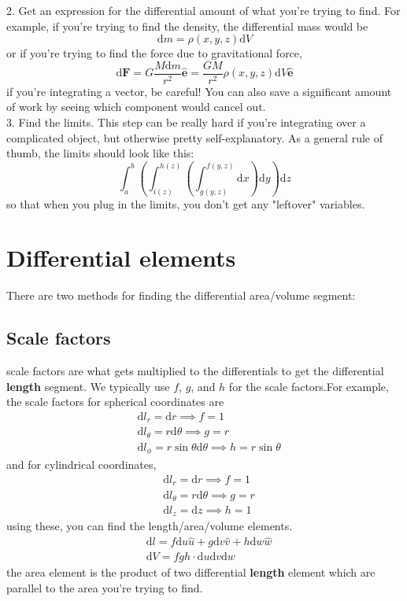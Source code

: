 \documentclass[oneside]{book}
\numberwithin{equation}{chapter} %
\begin{document}
2. Get an expression for the differential amount of what you're trying to find. For example, if you're trying to find the density, the differential mass would be
$$\mathrm dm=\rho (x,y,z)\mathrm dV$$
or if you're trying to find the force due to gravitational force, 
$$\mathrm d\mathbf F=G\frac{M\mathrm dm}{r^2}\mathbf{\hat e}=\frac{GM}{r^2}\rho(x,y,z)\mathrm dV\mathbf{\hat e}$$
if you're integrating a vector, be careful! You can also save a significant amount of work by seeing which component would cancel out. \\

3. Find the limits. This step can be really hard if you're integrating over a complicated object, but otherwise pretty self-explanatory. As a general rule of thumb, the limits should look like this:
$$\int^b_a\left(\int^{h(z)}_{i(z)}\left(\int^{f(y,z)}_{g(y,z)}\mathrm dx\right)\mathrm dy\right)\mathrm dz$$
so that when you plug in the limits, you don't get any "leftover" variables. 
\section{Differential elements}
There are two methods for finding the differential area/volume segment: 
\subsection{Scale factors}
scale factors are what gets multiplied to the differentials to get the differential \textbf{length} segment. We typically use $f$, $g$, and $h$ for the scale factors.For example, the scale factors for spherical coordinates are 
\begin{align}
	&\mathrm dl_r=\mathrm dr\implies f=1\\
	&\mathrm dl_\theta=r\mathrm d\theta\implies g=r\\
	&\mathrm dl_\phi=r\sin\theta\mathrm d\theta\implies h=r\sin\theta
\end{align}
and for cylindrical coordinates,
\begin{align}
	&\mathrm dl_r=\mathrm dr\implies f=1\\
	&\mathrm dl_\theta=r\mathrm d\theta\implies g=r\\
	&\mathrm dl_z= \mathrm dz\implies h=1
\end{align}
using these, you can find the length/area/volume elements. 
\begin{align}
	&\mathrm dl=f\mathrm du\hat u+g\mathrm dv\hat v+h\mathrm dw\hat w\\
	&\mathrm dV=fgh\cdot\mathrm du\mathrm dv\mathrm dw
\end{align}
the area element is the product of two differential \textbf{length} element which are parallel to the area you're trying to find. 
\end{document}
